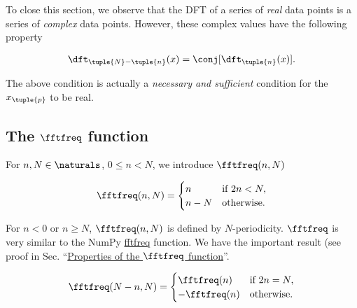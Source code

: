 \documentclass[oneside]{memoir}
\begin{document}
To close this section, we observe that the DFT of a series of \emph{real} data points is a series of \emph{complex} data points. However, these complex values have the following property



\begin{equation*}
\begin{split}\dft_{\tuple{N}-\tuple{n}}(x)=\conj[\dft_{\tuple{n}}(x)].\end{split}\end{equation*}


The above condition is actually a \emph{necessary and sufficient} condition for the \(x_{\tuple{p}}\) to be real.



\hypertarget{2160060583997998814}{}


\subsection{The \(\fftfreq\) function}



For \(n, N\in\naturals\), \(0\leq n<N\), we introduce \(\fftfreq(n, N)\)



\begin{equation*}
\begin{split}\fftfreq(n, N)=
\begin{cases}
n & \text{if }2n<N,\\
n-N & \text{otherwise.}
\end{cases}\end{split}\end{equation*}


For \(n<0\) or \(n\geq N\), \(\fftfreq(n, N)\) is defined by \(N\)-periodicity. \(\fftfreq\) is very similar to the NumPy \href{https://numpy.org/doc/1.18/reference/generated/numpy.fft.fftfreq.html\#numpy.fft.fftfreq}{fftfreq} function. We have the important result (see proof in Sec. “\hyperlink{15063944043531008847}{Properties of the \(\fftfreq\) function}”.



\begin{equation*}
\begin{split}\fftfreq(N-n, N)=
\begin{cases}
\fftfreq(n) & \text{if }2n=N,\\
-\fftfreq(n) & \text{otherwise.}
\end{cases}\end{split}\end{equation*}
\end{document}
